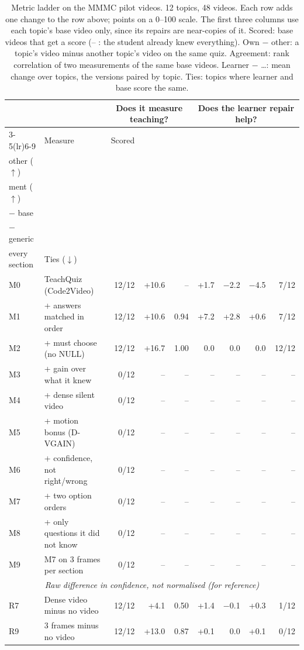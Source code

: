 \begin{table}[t]\centering\footnotesize
\caption{Metric ladder on the MMMC pilot videos. 12 topics, 48 videos. Each row adds one change to the row above; points on a 0--100 scale. The first three columns use each topic's base video only, since its repairs are near-copies of it. Scored: base videos that get a score (-- : the student already knew everything). Own $-$ other: a topic's video minus another topic's video on the same quiz. Agreement: rank correlation of two measurements of the same base videos. Learner $-$ \ldots: mean change over topics, the versions paired by topic. Ties: topics where learner and base score the same.}\label{tab:ladder_mmmc}
\setlength{\tabcolsep}{4pt}\begin{tabular}{@{}llrrrrrrr@{}}\toprule & & \multicolumn{3}{c}{Does it measure teaching?} & \multicolumn{4}{c}{Does the learner repair help?}\\
\cmidrule(lr){3-5}\cmidrule(lr){6-9}
& Measure & Scored & \hd{Own $-$\\other ($\uparrow$)} & \hd{Agree-\\ment ($\uparrow$)} & \hd{Learner\\$-$ base} & \hd{Learner\\$-$ generic} & \hd{Learner $-$\\every section} & Ties ($\downarrow$)\\\midrule
M0 & TeachQuiz (Code2Video) & 12/12 & +10.6 & -- & +1.7 & $-$2.2 & $-$4.5 & 7/12 \\
M1 & + answers matched in order & 12/12 & +10.6 & 0.94 & +7.2 & +2.8 & +0.6 & 7/12 \\
M2 & + must choose (no NULL) & 12/12 & +16.7 & 1.00 & 0.0 & 0.0 & 0.0 & 12/12 \\
M3 & + gain over what it knew & 0/12 & -- & -- & -- & -- & -- & -- \\
M4 & + dense silent video & 0/12 & -- & -- & -- & -- & -- & -- \\
M5 & + motion bonus (D-VGAIN) & 0/12 & -- & -- & -- & -- & -- & -- \\
M6 & + confidence, not right/wrong & 0/12 & -- & -- & -- & -- & -- & -- \\
M7 & + two option orders & 0/12 & -- & -- & -- & -- & -- & -- \\
M8 & + only questions it did not know & 0/12 & -- & -- & -- & -- & -- & -- \\
M9 & M7 on 3 frames per section & 0/12 & -- & -- & -- & -- & -- & -- \\
\midrule
\multicolumn{9}{c}{\textit{Raw difference in confidence, not normalised (for reference)}}\\
R7 & Dense video minus no video & 12/12 & +4.1 & 0.50 & +1.4 & $-$0.1 & +0.3 & 1/12 \\
R9 & 3 frames minus no video & 12/12 & +13.0 & 0.87 & +0.1 & 0.0 & +0.1 & 0/12 \\
\bottomrule\end{tabular}
\end{table}
